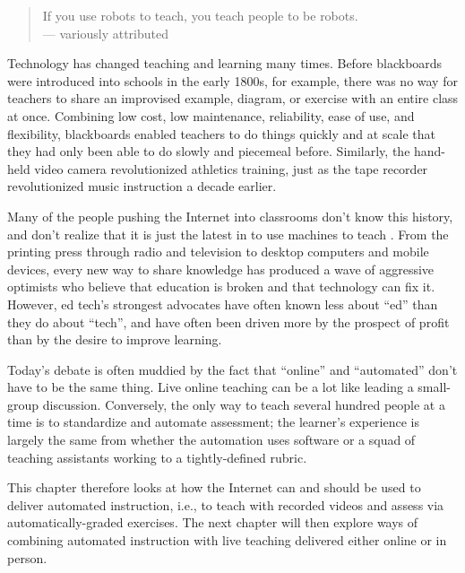 
\begin{quote}

  If you use robots to teach, you teach people to be robots. \\
  --- variously attributed

\end{quote}

Technology has changed teaching and learning many times. Before
blackboards were introduced into schools in the early 1800s, for
example, there was no way for teachers to share an improvised example,
diagram, or exercise with an entire class at once. Combining low cost,
low maintenance, reliability, ease of use, and flexibility, blackboards
enabled teachers to do things quickly and at scale that they had only
been able to do slowly and piecemeal before. Similarly, the hand-held
video camera revolutionized athletics training, just as the tape
recorder revolutionized music instruction a decade earlier.

Many of the people pushing the Internet into classrooms don't know
this history, and don't realize that it is just the latest in  to use machines to teach
\cite{Watt2014}. From the printing press through radio and
television to desktop computers and mobile devices, every new way to
share knowledge has produced a wave of aggressive optimists who
believe that education is broken and that technology can fix
it. However, ed tech's strongest advocates have often known less about
``ed'' than they do about ``tech'', and have often been driven more by the
prospect of profit than by the desire to improve learning.

Today's debate is often muddied by the fact that ``online'' and
``automated'' don't have to be the same thing. Live online teaching
can be a lot like leading a small-group discussion. Conversely, the only
way to teach several hundred people at a time is to standardize and
automate assessment; the learner's experience is largely the same from
whether the automation uses software or a squad of teaching assistants
working to a tightly-defined rubric.

This chapter therefore looks at how the Internet can and should be used
to deliver automated instruction, i.e., to teach with recorded videos
and assess via automatically-graded exercises. The next chapter will
then explore ways of combining automated instruction with live teaching
delivered either online or in person.

